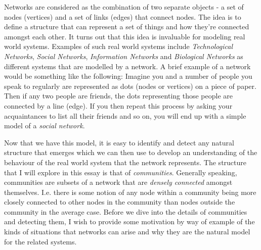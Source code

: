 Networks are considered as the combination of two separate objects - a set of nodes (vertices) and a set of links (edges) that connect nodes. The idea is to define a structure that can represent a set of things and how they're connected amongst each other. It turns out that this idea is invaluable for modeling real world systems. Examples of such real world systems include \emph{Technological Networks}, \emph{Social Networks}, \emph{Information Networks} and \emph{Biological Networks} as different systems that are modelled by a network.\cite[Contents]{newman10} A brief example of a network would be something like the following: Imagine you and a number of people you speak to regularly are represented as dots (nodes or vertices) on a piece of paper. Then if any two people are friends, the dots representing those people are connected by a line (edge). If you then repeat this process by asking your acquaintances to list all their friends and so on, you will end up with a simple model of a \emph{social network}.

Now that we have this model, it is easy to identify and detect any natural structure that emerges which we can then use to develop an understanding of the behaviour of the real world system that the network represents. The structure that I will explore in this essay is that of \emph{communities}. Generally speaking, communities are subsets of a network that are \emph{densely connected} amongst themselves. I.e. there is some notion of any node within a community being more closely connected to other nodes in the community than nodes outside the community in the average case. Before we dive into the details of communities and detecting them, I wish to provide some motivation by way of example of the kinds of situations that networks can arise and why they are the natural model for the related systems.

